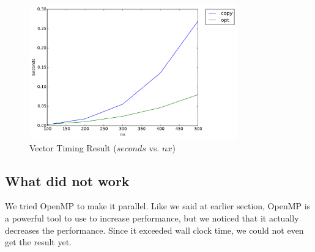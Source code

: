 \begin{figure}[h]
    \centering
    \includegraphics[width=0.8\textwidth]{figs/opt-timing2.pdf}
    \caption{Vector Timing Result ($seconds$ vs. $nx$)}
    \label{fig:opt_timing_result2}
\end{figure}

\subsection{What did not work}
We tried OpenMP to make it parallel. Like we said at earlier section, OpenMP is a powerful tool to use to increase performance, but we noticed that it actually decreases the performance. Since it exceeded wall clock time, we could not even get the result yet.
